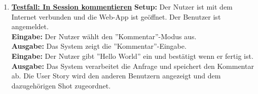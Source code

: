 \begin{enumerate}
	
	\item \underline{\textbf{Testfall: In Session kommentieren}} \linebreak
	\textbf{Setup:} Der Nutzer ist mit dem Internet verbunden und die Web-App ist geöffnet. Der Benutzer ist angemeldet.\\
	\textbf{Eingabe:} Der Nutzer wählt den ''Kommentar''-Modus aus. \\
	\textbf{Ausgabe:} Das System zeigt die ''Kommentar''-Eingabe. \\
	\textbf{Eingabe:} Der Nutzer gibt ''Hello World'' ein und bestätigt wenn er fertig ist.\\
	\textbf{Ausgabe:} Das System verarbeitet die Anfrage und speichert den Kommentar ab. Die User Story wird den anderen Benutzern angezeigt und dem dazugehörigen Shot zugeordnet. \\
	
	

\end{enumerate}
